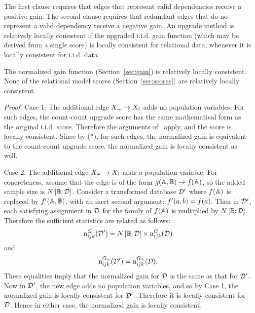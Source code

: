 \documentclass[letterpaper]{article}
\begin{document}
 
The first clause requires that edges that represent valid dependencies receive a positive gain. The second clause requires that redundant edges that do no represent a valid dependency receive a negative gain. An upgrade method is relatively locally consistent if the upgraded i.i.d. gain function (which may be derived from a single score) is locally consistent for relational data, whenever it is locally consistent for i.i.d. data.
 
\begin{theorem} \label{th:consistency}
The normalized gain function (Section~\ref{sec:gain})  is relatively locally consistent. 
None of the relational model scores (Section~\ref{sec:scores}) are relatively locally consistent.
\end{theorem}
 
{\em Proof.} Case 1: The additional edge $X_{+} \rightarrow X_{i}$ adds no population variables. For such edges, the count-count upgrade score  has the same mathematical form as the original i.i.d. score. Therefore the arguments of~\cite{Chickering2003} apply, and the score is locally consistent. Since by (*), for such edges, the normalized gain is equivalent to the count-count upgrade score, 
the normalized gain is locally consistent as well. 

Case 2: The additional edge $X_{+} \rightarrow X_{i}$ adds a population variable. For concreteness, assume that the edge is of the form $g(\mathbb{A},\mathbb{B}) \rightarrow f(\mathbb{A})$, so the added sample size is $N\left[\mathbb{B};\mathcal{D}\right]$. Consider a transformed database $\mathcal{D}'$ where $f(\mathbb{A})$ is replaced by $f'(\mathbb{A},\mathbb{B})$, with an inert second argument: $f'(a,b) = f(a)$. Then in $\mathcal{D}'$, each satisfying assignment in $\mathcal{D}$ for the family of $f(\mathbb{A})$  is multiplied by $N\left[\mathbb{B};\mathcal{D}\right]$. Therefore the sufficient statistics are related as follows: 
$$\mathrm{n}^{G}_{ijk}(\mathcal{D}') = 
N\left[\mathbb{B};\mathcal{D}\right] \times\mathrm{n}^{G}_{ijk}(\mathcal{D})$$ and $$\mathrm{n}^{G_{+}}_{ijk}(\mathcal{D}') = 
\mathrm{n}^{G_{+}}_{ijk}(\mathcal{D}).$$ These equalities imply that the normalized gain for $\mathcal{D}$ is the same as that for $\mathcal{D}'$. Now in $\mathcal{D}'$, the new edge adds no population variables, and so by Case 1, the normalized gain is locally consistent for $\mathcal{D}'$. Therefore it is locally consistent for $\mathcal{D}$. Hence in either case, the normalized gain is locally consistent.
\end{document}
